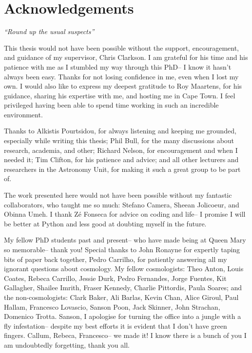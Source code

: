 \chapter*{Acknowledgements}
\label{ch:acknowledgements}

\begin{flushright}
{\footnotesize \textit {``Round up the usual suspects''}}
\end{flushright}

This thesis would not have been possible without the support, encouragement, and guidance of my supervisor, Chris Clarkson. I am grateful for his time and his patience with me as I stumbled my way through this PhD-- I know it hasn't always been easy. Thanks for not losing confidence in me, even when I lost my own. I would also like to express my deepest gratitude to Roy Maartens, for his guidance, sharing his expertise with me, and hosting me in Cape Town. I feel privileged having been able to spend time working in such an incredible environment.

Thanks to Alkistis Pourtsidou, for always listening and keeping me grounded, especially while writing this thesis; Phil Bull, for the many discussions about research, academia, and other; Richard Nelson, for encouragement and when I needed it; Tim Clifton, for his patience and advice; and all other lecturers and researchers in the Astronomy Unit, for making it such a great group to be part of. 

The work presented here would not have been possible without my fantastic collaborators, who taught me so much: Stefano Camera, Sheean Jolicoeur, and Obinna Umeh. I thank Z\'e Fonseca for advice on coding and life-- I promise I will be better at Python and less good at doubting myself in the future. 

My fellow PhD students past and present-- who have made being at Queen Mary so memorable-- thank you! Special thanks to John Ronayne for expertly taping bits of paper back together, Pedro Carrilho, for patiently answering all my ignorant questions about cosmology. My fellow cosmologists: Theo Anton, Louis Coates, Rebeca Carrillo, Jessie Durk, Pedro Fernandes, Jorge Fuentes, Kit Gallagher, Shailee Imrith, Fraser Kennedy, Charlie Pittordis, Paula Soares; and the non-cosmologists: Clark Baker, Ali Barlas, Kevin Chan, Alice Giroul, Paul Hallam, Francesco Lovascio, Sanson Poon, Jack Skinner, John Strachan, Domenico Trotta. Sanson, I apologise for turning the office into a jungle with a fly infestation-- despite my best efforts it is evident that I don't have green fingers. Callum, Rebeca, Francesco-- we made it! I know there is a bunch of you I am undoubtedly forgetting, thank you all. 

